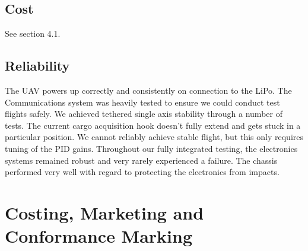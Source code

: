 \documentclass[a4paper,11pt]{article}
\begin{document}
\subsection{Cost}
See section 4.1.
\subsection{Reliability}
The UAV powers up correctly and consistently on connection to the LiPo.
The Communications system was heavily tested to ensure we could conduct test flights safely.
We achieved tethered single axis stability through a number of tests.
The current cargo acquisition hook doesn't fully extend and gets stuck in a particular position.
We cannot reliably achieve stable flight, but this only requires tuning of the PID gains.
Throughout our fully integrated testing, the electronics systems remained robust and very rarely experienced a failure.
The chassis performed very well with regard to protecting the electronics from impacts.

\section{Costing, Marketing and Conformance Marking}
\end{document}
